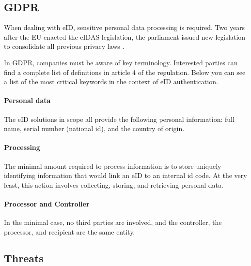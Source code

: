 \subsection{GDPR}

When dealing with eID, sensitive personal data processing is required. Two years after the EU enacted the eIDAS legislation, the parliament issued new legislation to consolidate all previous privacy laws \cite{eulaw-gdpr}.

In GDPR, companies must be aware of key terminology. Interested parties can find a complete list of definitions in article 4 of the regulation. Below you can see a list of the most critical keywords in the context of eID authentication.

\paragraph{Personal data} The eID solutions in scope all provide the following personal information: full name, serial number (national id), and the country of origin.

\paragraph{Processing} The minimal amount required to process information is to store uniquely identifying information that would link an eID to an internal id code. At the very least, this action involves collecting, storing, and retrieving personal data.

\paragraph{Processor and Controller} In the minimal case, no third parties are involved, and the controller, the processor, and recipient are the same entity.

\subsection{Threats}



